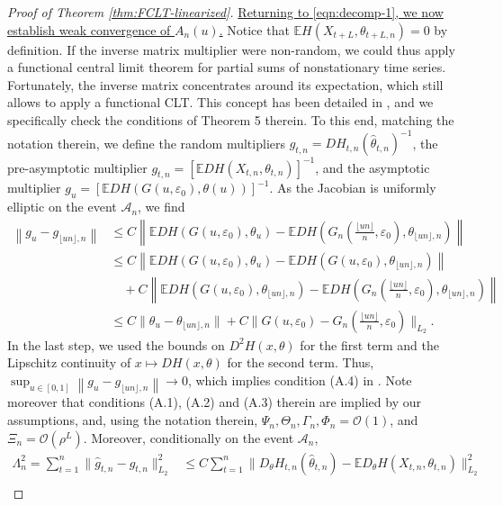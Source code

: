 \documentclass[10pt, a4paper]{article}
\theoremstyle{assumption}
\theoremstyle{definition}
\theoremstyle{theorem}
\newcommand{\E}{\mathbb{E}}
\begin{document}
\begin{proof}[Proof of Theorem \ref{thm:FCLT-linearized}]
    \underline{Returning to \eqref{eqn:decomp-1}, we now establish weak convergence of $A_n(u)$.}
    Notice that $\E H(X_{t+L}, \theta_{t+L,n})=0$ by definition.
    If the inverse matrix multiplier were non-random, we could thus apply a functional central limit theorem for partial sums of nonstationary time series. 
    Fortunately, the inverse matrix concentrates around its expectation, which still allows to apply a functional CLT. 
    This concept has been detailed in \cite{mies_strong_2025}, and we specifically check the conditions of Theorem 5 therein.
    To this end, matching the notation therein, we define the random multipliers $\widehat{g}_{t,n}=DH_{t,n}(\widehat{\theta}_{t,n})^{-1}$, the pre-asymptotic multiplier $g_{t,n} = [\E D H(X_{t,n}, \theta_{t,n})]^{-1}$, and the asymptotic multiplier $g_u = [\E D H(G(u,\varepsilon_0), \theta(u))]^{-1} $.
    As the Jacobian is uniformly elliptic on the event $\mathcal{A}_n$, we find
    \begin{align*}
        \left\| g_u-g_{\lfloor un\rfloor,n} \right\| 
        &\leq C \left\| \E DH(G(u, \varepsilon_0), \theta_u) - \E DH(G_n(\tfrac{\lfloor un\rfloor}{n}, \varepsilon_0), \theta_{\lfloor un\rfloor, n})  \right\| \\
        & \leq C \left\| \E DH(G(u, \varepsilon_0), \theta_u) -  \E DH(G(u, \varepsilon_0), \theta_{\lfloor un\rfloor, n})\right\| \\
        &\quad + C\left\| \E DH(G(u, \varepsilon_0), \theta_{\lfloor un\rfloor, n}) -
        \E DH(G_n(\tfrac{\lfloor un\rfloor}{n}, \varepsilon_0), \theta_{\lfloor un\rfloor, n})  \right\|\\
        &\leq C \|\theta_u - \theta_{\lfloor un\rfloor, n} \| + C \|G(u, \varepsilon_0)-G_n(\tfrac{\lfloor un\rfloor}{n},\varepsilon_0)\|_{L_2}.
    \end{align*}
    In the last step, we used the bounds on $D^2H(x,\theta)$ for the first term and the Lipschitz continuity of $x\mapsto DH(x,\theta)$ for the second term.
    Thus, $\sup_{u\in[0,1]} \left\| g_u-g_{\lfloor un\rfloor,n} \right\| \to 0$, which implies condition (A.4) in \citep{mies_strong_2025}.
    Note moreover that conditions (A.1), (A.2) and (A.3) therein are implied by our assumptions, and, using the notation therein, $\Psi_n, \Theta_n,\Gamma_n, \Phi_n=\mathcal{O}(1)$, and $\Xi_n = \mathcal{O}(\rho^{L})$.
    Moreover, conditionally on the event $\mathcal{A}_n$,
    \begin{align*}
        \Lambda_n^2
        = \sum_{t=1}^n \|\hat{g}_{t,n}-g_{t,n}\|_{L_2}^2 
        &\leq C \sum_{t=1}^n \|D_\theta H_{t,n}(\widehat{\theta}_{t,n}) - \E D_\theta H(X_{t,n},\theta_{t,n})\|_{L_2}^2 \\

\end{align*}
\end{proof}
\end{document}
